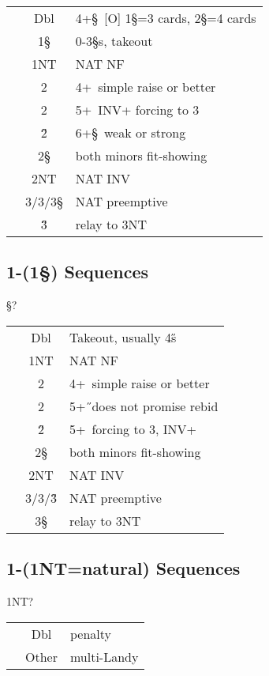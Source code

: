 \begin{longtable}{C{\linklength} C{\bidlength} l}
& Dbl & 4+\S \ [O] 1\S=3 cards, 2\S=4 cards \\
& 1\S & 0-3\S s, takeout \\
& 1NT & NAT NF \\
& 2\C & 4+\D\ simple raise or better \\
& 2\D & 5+\C\  INV+ forcing to 3\C \\
& 2\H & 6+\S\ weak or strong \\
& 2\S & both minors fit-showing \\
& 2NT & NAT INV \\
& 3\C/3\D/3\S & NAT preemptive \\ 
& 3\H & relay to 3NT \\ 
\end{longtable}

\subsection{1\D-(1\S) Sequences}

\begin{bidding}
\>\D{}\S\>?
\end{bidding}

\begin{longtable}{C{\linklength} C{\bidlength} l}
& Dbl & Takeout, usually 4\H s \\
& 1NT & NAT NF \\
& 2\C & 4+\D\ simple raise or better \\
& 2\D & 5+\H\ does not promise rebid \\
& 2\H & 5+\C\ forcing to 3\C, INV+ \\
& 2\S & both minors fit-showing \\
& 2NT & NAT INV \\
& 3\C/3\D/3\H & NAT preemptive \\ 
& 3\S & relay to 3NT \\ 
\end{longtable}

\subsection{1\D-(1NT=natural) Sequences}

\begin{bidding}
\>\D\>1NT\>?
\end{bidding}

\begin{longtable}{C{\linklength} C{\bidlength} l}
& Dbl & penalty \\
& Other & multi-Landy 
\end{longtable}


